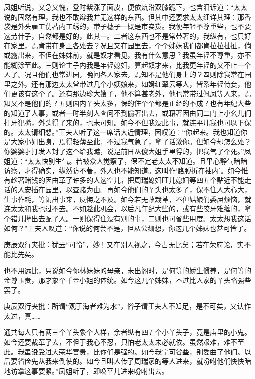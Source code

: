 \begin{parag}


    凤姐听说，又急又愧，登时紫涨了面皮，便依炕沿双膝跪下，也含泪诉道：“太太说的固然有理，我也不敢辩我并无这样的东西。但其中还要求太太细详其理：那香袋是外头雇工仿著内工绣的，带子穗子一概是市卖货。我便年轻不尊重些，也不要这劳什子，自然都是好的，此其一。二者这东西也不是常带著的，我纵有，也只好在家里，焉肯带在身上各处去？况且又在园里去，个个姊妹我们都肯拉拉扯扯，倘或露出来，不但在姊妹前，就是奴才看见，我有什么意思？我虽年轻不尊重，亦不能糊涂至此。三则论主子内我是年轻媳妇，算起奴才来，比我更年轻的又不止一个人了。况且他们也常进园，晚间各人家去，焉知不是他们身上的？四则除我常在园里之外，还有那边太太常带过几个小姨娘来，如嫣红翠云等人，皆系年轻侍妾，他们更该有这个了。还有那边珍大嫂子，他不算甚老外，他也常带过佩凤等人来，焉知又不是他们的？五则园内丫头太多，保的住个个都是正经的不成？也有年纪大些的知道了人事，或者一时半刻人查问不到偷著出去，或藉著因由同二门上小幺儿们打牙犯嘴，外头得了来的，也未可知。如今不但我没此事，就连平儿我也可以下保的。太太请细想。”王夫人听了这一席话大近情理，因叹道：“你起来。我也知道你是大家小姐出身，焉得轻薄至此，不过我气急了，拿了话激你。但如今却怎么处？你婆婆才打发人封了这个给我瞧，说是前日从傻大姐手里得的，把我气了个死。”凤姐道：“太太快别生气。若被众人觉察了，保不定老太太不知道。且平心静气暗暗访察，才得确实，纵然访不著，外人也不能知道。这叫作‘胳膊折在袖内’。如今惟有趁著赌钱的因由革了许多的人这空儿，把周瑞媳妇旺儿媳妇等四五个贴近不能走话的人安插在园里，以查赌为由。再如今他们的丫头也太多了，保不住人大心大，生事作耗，等闹出事来，反悔之不及。如今若无故裁革，不但姑娘们委屈烦恼，就连太太和我也过不去。不如趁此机会，以后凡年纪大些的，或有些咬牙难缠的，拿个错儿撵出去配了人。一则保得住没有别的事，二则也可省些用度。太太想我这话如何？”王夫人叹道：“你说的何尝不是，但从公细想，你这几个姊妹也甚可怜了。\begin{note}庚辰双行夹批：犹云“可怜”，妙！又在别人视之，今古无比矣；若在荣府论，实不能比先矣。\end{note}也不用远比，只说如今你林妹妹的母亲，未出阁时，是何等的娇生惯养，是何等的金尊玉贵，那才象个千金小姐的体统。如今这几个姊妹，不过比人家的丫头略强些罢了。\begin{note}庚辰双行夹批：所谓“观于海者难为水”，俗子谓王夫人不知足，是不可矣，又认作太过，真……\end{note}通共每人只有两三个丫头象个人样，余者纵有四五个小丫头子，竟是庙里的小鬼。如今还要裁革了去，不但于我心不忍，只怕老太太未必就依。虽然艰难，难不至此。我虽没受过大荣华富贵，比你们是强的。如今我宁可省些，别委曲了他们。以后要省俭先从我来倒使的。如今且叫人传了周瑞家的等人进来，就吩咐他们快快暗地访拿这事要紧。”凤姐听了，即唤平儿进来吩咐出去。
\end{parag}


